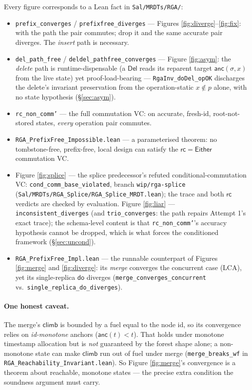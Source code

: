 \documentclass[11pt]{article}
\newcommand{\anc}{\mathsf{anc}}
\newcommand{\climb}{\mathsf{climb}}
\newcommand{\rc}{\mathsf{rc}}
\newcommand{\doo}{\mathsf{do}}
\newcommand{\Del}{\mathsf{Del}}
\newcommand{\Either}{\mathsf{Either}}
\begin{document}
Every figure corresponds to a Lean fact in
\texttt{Sal/MRDTs/RGA/}:
\begin{itemize}
  \item \texttt{prefix\_converges} / \texttt{prefixfree\_diverges} --- Figures
        \ref{fig:diverge}--\ref{fig:fix}: with the path the pair commutes; drop it
        and the same accurate pair diverges. The \emph{insert} path is necessary.
  \item \texttt{del\_path\_free} / \texttt{deldel\_pathfree\_converges} --- Figure
        \ref{fig:asym}: the \emph{delete} path is runtime-dispensable (a $\Del$ reads
        its reparent target $\anc(\sigma,x)$ from the live state) yet
        proof-load-bearing --- \texttt{RgaInv\_doDel\_opOK} discharges the delete's
        invariant preservation from the operation-static $x\notin p$ alone, with no
        state hypothesis (\S\ref{sec:asym}).
  \item \texttt{rc\_non\_comm'} --- the full commutation VC: on accurate,
        fresh-id, root-not-stored states, \emph{every} operation pair commutes.
  \item \texttt{RGA\_PrefixFree\_Impossible.lean} --- a parameterised theorem: no
        tombstone-free, prefix-free, local design can satisfy the $\rc=\Either$
        commutation VC.
  \item Figure \ref{fig:splice} --- the splice predecessor's refuted
        conditional-commutation VC: \texttt{cond\_comm\_base\_violated}, branch
        \texttt{wip/rga-splice}
        (\texttt{Sal/MRDTs/RGA\_Splice/RGA\_Splice\_MRDT.lean}); the trace and
        both $\rc$ verdicts are checked by evaluation. Figure
        \ref{fig:liar} --- \texttt{inconsistent\_diverges} (and
        \texttt{trio\_converges}: the path repairs Attempt 1's exact trace);
        the schema-level content is that \texttt{rc\_non\_comm'}'s accuracy
        hypothesis cannot be dropped, which is what forces the conditioned
        framework (\S\ref{sec:uncond}).
  \item \texttt{RGA\_PrefixFree\_Impl.lean} --- the runnable counterpart of
        Figures \ref{fig:merge} and \ref{fig:diverge}: its \emph{merge} converges
        the concurrent case (LCA), yet its single-replica $\doo$ diverges
        (\texttt{merge\_converges\_concurrent} vs.\
        \texttt{single\_replica\_do\_diverges}).
\end{itemize}

\paragraph{One honest caveat.} The merge's $\climb$ is bounded by a fuel equal to
the node id, so its convergence relies on \emph{id-monotone} anchors
($\anc(t) < t$). That holds under monotone timestamp allocation but is \emph{not}
guaranteed by the forest shape alone; a non-monotone state can make $\climb$ run
out of fuel under merge (\texttt{merge\_breaks\_wf} in
\texttt{RGA\_Reachability\_Invariant.lean}). So Figure \ref{fig:merge}'s
convergence is a theorem about reachable, monotone states --- the precise extra
condition the soundness argument must carry.
\end{document}
